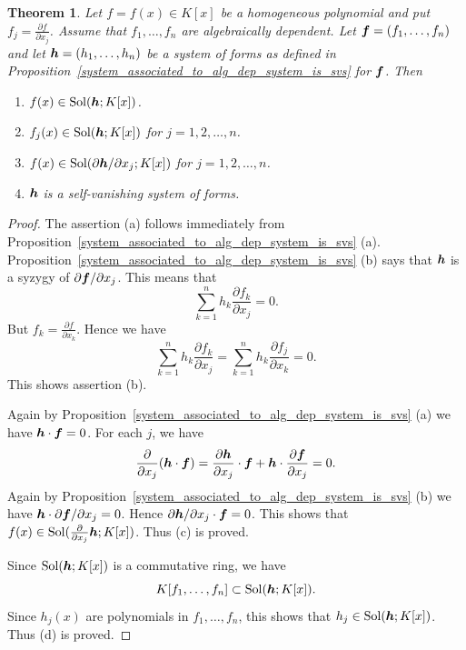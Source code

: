 \documentclass[12pt]{article}
\newtheorem{theorem}{Theorem}[section]
\theoremstyle{definition}
\theoremstyle{remark}
\def\sol{{\rm Sol}}
\def\boldh{\mbox{\boldmath $h$}}
\def\boldf{\mbox{\boldmath $f$}}
\def\pa{\partial}
\begin{document}
\begin{theorem}  \label{duality}   %
Let $f=f(x) \in K[x]$ be a homogeneous polynomial and put $f_j=\frac{\pa f}{\pa x_j}$.  
Assume that $f_1, \ldots , f_n$  are algebraically dependent. 
Let $\boldf=(f_1, \dots, f_n)$ and let 
$\boldh=(h_1, \ldots, h_n)$ be a system of forms as defined in 
Proposition~\ref{system_associated_to_alg_dep_system_is_svs} for $\boldf$.  
Then  %
\begin{enumerate}
\item[{\rm (a)}] 
$f(x) \in \sol(\boldh; K[x])$.
\item[{\rm (b)}]
$f_j(x) \in \sol(\boldh;  K[x])$ for $j=1,2, \ldots, n$.
\item[{\rm (c)}]
$f(x) \in \sol(\pa \boldh/ \pa x_j; K[x])$ for $j=1,2, \ldots, n$. 
\item[{\rm (d)}]
$\boldh$ is a self-vanishing system of forms.
\end{enumerate}

\end{theorem}

\begin{proof}
The assertion (a) follows immediately from 
Proposition~\ref{system_associated_to_alg_dep_system_is_svs} (a).   
Proposition~\ref{system_associated_to_alg_dep_system_is_svs} (b) says that  
$\boldh$ is a syzygy of $\pa \boldf/ \pa x_j$.  This means that 
\[\sum _{k=1} ^{n} h_k \frac{\pa f_k}{\pa x_j}=0.\]
But $f_k=\frac{\pa f}{\pa x_k}$.  
Hence we have 
\[\sum _{k=1} ^{n} h_k \frac{\pa f_k}{\pa x_j}      = \sum _{k=1} ^{n} h_k \frac{\pa f_j}{\pa x_k}   =0.\]
This shows  assertion (b).  

Again by Proposition~\ref{system_associated_to_alg_dep_system_is_svs} (a) we have $\boldh \cdot \boldf=0$.  
For each $j$, we have   
\[  \frac{\pa}{\pa x_j}(\boldh\cdot \boldf)= \frac{\pa \boldh}{\pa x_j} \cdot \boldf + \boldh \cdot \frac{\pa \boldf}{\pa x_j}=0.\]
Again by Proposition~\ref{system_associated_to_alg_dep_system_is_svs} (b) we have $\boldh \cdot {\pa \boldf}/{\pa x_j}=0$.  
Hence ${\pa \boldh}/{\pa x_j} \cdot \boldf =0$.  This shows that $f(x) \in \sol(\frac{\pa}{\pa x_j}\boldh; K[x])$. 
Thus (c) is proved. 

Since $\sol(\boldh; K[x])$ is a commutative ring, we have 
\[K[f_1, \ldots, f_n]  \subset \sol(\boldh; K[x]). \]
Since $h_j(x)$ are polynomials in $f_1, \ldots, f_n$, 
this shows that $h_j \in \sol(\boldh; K[x])$. Thus  (d) is proved.  
\end{proof}
\end{document}
